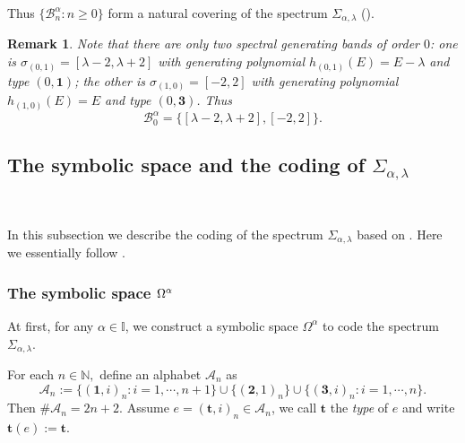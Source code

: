 \documentclass[reqno,11pt,graphicx,]{amsart}
\numberwithin{equation}{section}
\theoremstyle{plain}
\newcommand{\3}{\mathbf{3}}
\newtheorem{remark}[theorem]{Remark}
\begin{document}
	Thus $\{{\mathcal{B}}_n^\alpha: n\ge0\}$ form a natural covering of the
	spectrum $\Sigma_{\alpha,\lambda}$ (\cite{LPW2007,LW2005}).
	
	\begin{remark}
		\label{B-n} Note that there are only two spectral generating bands of
		order $0$: one is $\sigma_{(0,1)}=[\lambda-2,\lambda+2]$ with
		generating polynomial $h_{(0,1)}(E)=E-\lambda$ and type $(0,\mathbf{1%
		})$; the other is $\sigma_{(1,0)}=[-2,2]$ with generating
		polynomial $h_{(1,0)}(E)=E$ and type $(0,\mathbf{3})$. Thus 
		\begin{equation}\label{B-0}
			{\mathcal{B}}_0^\alpha=\{[\lambda-2,\lambda+2], [-2,2]\}.
		\end{equation}
	\end{remark}
	
	\subsection{The symbolic space and the coding of $\Sigma_{\alpha,\lambda}$}
	\label{sec-spectrum-2}\ 
	
	In this subsection we describe the coding of the spectrum $\Sigma_{\alpha,%
		\lambda}$ based on \cite{CQ2023,Qu2016,Qu2018}. Here we
	essentially follow \cite{CQ2023}.
	
	\subsubsection{The symbolic space $\Omega^{\protect\alpha}$}
	
	At first, for any $\alpha\in{\mathbb{I}}$, we construct a symbolic space $\Omega^{\alpha}$ to code the spectrum $\Sigma_{\alpha,\lambda}$. 
	
	For each $n\in{\mathbb{N}},$ define an alphabet $\mathscr{A}_n$ as 
	\begin{equation*}\label{alphabet-n}
		\mathscr{A}_n:=\{(\mathbf{1},i)_n:i=1,\cdots,n+1\}\cup \{(\mathbf{2}%
		,1)_n\}\cup \{(\mathbf{3},i)_n:i=1,\cdots,n\}.
	\end{equation*}
	Then $\#\mathscr{A}_n=2n+2.$ Assume $e=(\mathbf{t},i)_n\in \mathscr{A}_n$,
	we call $\mathbf{t}$ the \textit{type} of $e$ and write $\mathbf{t}(e):=\mathbf{t}$.
	
\end{document}
